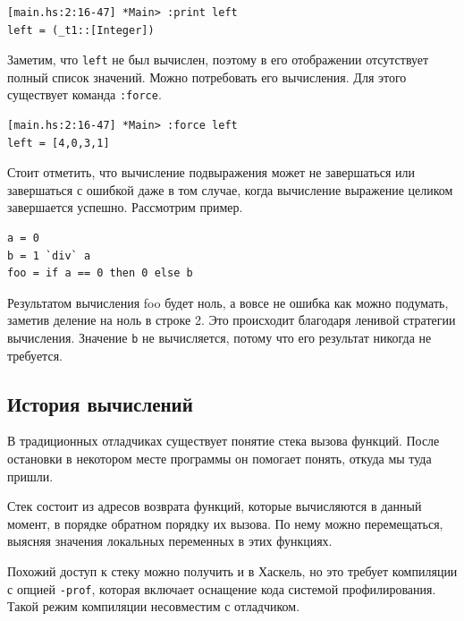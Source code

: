 \documentclass[fontsize=14pt, paper=a4, pagesize, DIV=calc]{scrartcl}
\def\code#1{\texttt{#1}}
\begin{document}
\begin{ListingEnv}
\caption{}
\begin{lstlisting}[numbers=none]
[main.hs:2:16-47] *Main> :print left
left = (_t1::[Integer])
\end{lstlisting}
\end{ListingEnv}

Заметим, что \code{left} не был вычислен, поэтому в его отображении отсутствует
полный список значений. Можно потребовать его вычисления. Для этого существует
команда \code{:force}. 

\begin{ListingEnv}
\caption{}
\begin{lstlisting}[numbers=none]
[main.hs:2:16-47] *Main> :force left
left = [4,0,3,1]
\end{lstlisting}
\end{ListingEnv}

Стоит отметить, что вычисление подвыражения может не завершаться или
завершаться с ошибкой даже в том случае, когда вычисление выражение целиком
завершается успешно. Рассмотрим пример.

\begin{ListingEnv}
\caption{main.hs}
\begin{lstlisting}
a = 0
b = 1 `div` a
foo = if a == 0 then 0 else b
\end{lstlisting}
\end{ListingEnv}

Результатом вычисления foo будет ноль, а вовсе не ошибка как можно подумать,
заметив деление на ноль в строке 2. Это происходит благодаря ленивой стратегии
вычисления. Значение \code{b} не вычисляется, потому что его результат
никогда не требуется. 

\subsection{История вычислений}

В традиционных отладчиках существует понятие стека вызова функций. После
остановки в некотором месте программы он помогает понять, откуда мы туда
пришли. 

Стек состоит из адресов возврата функций, которые вычисляются в данный момент,
в порядке обратном порядку их вызова. По нему можно перемещаться, выясняя
значения локальных переменных в этих функциях.

Похожий доступ к стеку можно получить и в Хаскель, но это требует компиляции с
опцией \code{-prof}, которая включает оснащение кода системой профилирования.
Такой режим компиляции несовместим с отладчиком. 
\end{document}
